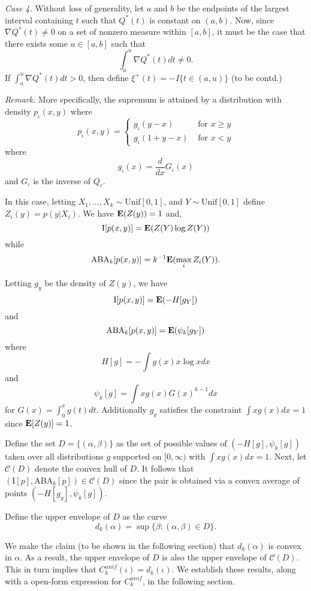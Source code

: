 \documentclass[12pt]{article}
\begin{document}
\emph{Case 4.}
Without loss of generality, let $a$ and $b$ be the endpoints of the
largest interval containing $t$ such that $Q^*(t)$ is constant on $(a,
b)$.  Now, since $\nabla Q^*(t) \neq 0$ on a set of nonzero measure
within $[a, b]$, it must be the case that there exists some $u \in [a,
b]$ such that
\[
\int_a^u \nabla Q^*(t) dt \neq 0.
\]
If $\int_a^u \nabla Q^*(t) dt > 0$, then define $\xi^+(t) = -I\{t \in
(a, u)\}$ (to be contd.)



\emph{Remark.}
More specifically, the supremum is attained by a distribution with
density $p_\iota(x, y)$ where
\[
p_\iota(x, y) = \begin{cases}
g_\iota(y - x) & \text{ for } x\geq y\\
g_\iota(1 + y - x) & \text{ for } x < y
\end{cases}
\]
where
\[
g_\iota(x) = \frac{d}{dx}G_\iota(x)
\]
and $G_\iota$ is the inverse of $Q_c$.



In this case, letting $X_1,...,X_k \sim \text{Unif}[0,1]$, and $Y \sim \text{Unif}[0,1]$ define $Z_i(y) = p(y|X_i)$.
We have $\textbf{E}(Z(y)) = 1$ and,
\[
\text{I}[p(x,y)] = \textbf{E}(Z(Y) \log Z(Y))
\]
while
\[
\text{ABA}_k[p(x,y)] = k^{-1}\textbf{E}(\max_i Z_i(Y)).
\]

Letting $g_y$ be the density of $Z(y)$, we have
\[
\text{I}[p(x,y)] = \textbf{E}(-H[g_Y])
\]
and
\[
\text{ABA}_k[p(x,y)] = \textbf{E}(\psi_k[g_Y])
\]
where
\[
H[g] = -\int g(x) x \log x dx
\]
and
\[
\psi_k[g] = \int x g(x) G(x)^{k-1} dx
\]
for $G(x) = \int_0^x g(t) dt.$
Additionally $g_y$ satisfies the constraint $\int x g(x) dx= 1$ since $\textbf{E}[Z(y)] = 1$.

Define the set $D = \{(\alpha, \beta)\}$ as the set of possible values
of $(-H[g], \psi_k[g])$ taken over all distributions $g$ supported on
$[0,
\infty)$ with $\int x g(x) dx = 1$.  Next, let $\mathcal{C}(D)$ denote the convex hull of $D$.
It follows that $(\text{I}[p], \text{ABA}_k[p]) \in \mathcal{C}(D)$ since the pair is obtained via a convex average of points $(-H[g_y], \psi_k[g])$.

Define the upper envelope of $D$ as the curve
\[
d_k(\alpha) = \sup\{\beta: (\alpha, \beta) \in D\}.
\]

We make the claim (to be shown in the following section) that $d_k(\alpha)$ is convex in $\alpha$.
As a result, the upper envelope of $D$ is also the upper envelope of $\mathcal{C}(D)$.
This in turn implies that $C_k^{unif}(\iota) = d_k(\iota)$.
We establish these results, along with a open-form expression for $C_k^{unif}$, in the following section.
\end{document}
